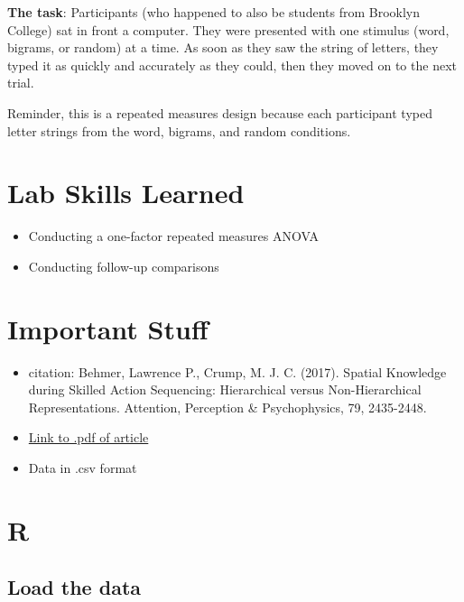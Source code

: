 \documentclass[
]{book}
\providecommand{\tightlist}{%
  \setlength{\itemsep}{0pt}\setlength{\parskip}{0pt}}
\begin{document}
\textbf{The task}: Participants (who happened to also be students from Brooklyn College) sat in front a computer. They were presented with one stimulus (word, bigrams, or random) at a time. As soon as they saw the string of letters, they typed it as quickly and accurately as they could, then they moved on to the next trial.

Reminder, this is a repeated measures design because each participant typed letter strings from the word, bigrams, and random conditions.

\hypertarget{lab-skills-learned-3}{%
\section{Lab Skills Learned}\label{lab-skills-learned-3}}

\begin{itemize}
\tightlist
\item
  Conducting a one-factor repeated measures ANOVA
\item
  Conducting follow-up comparisons
\end{itemize}

\hypertarget{important-stuff-3}{%
\section{Important Stuff}\label{important-stuff-3}}

\begin{itemize}
\tightlist
\item
  citation: Behmer, Lawrence P., Crump, M. J. C. (2017). Spatial Knowledge during Skilled Action Sequencing: Hierarchical versus Non-Hierarchical Representations. Attention, Perception \& Psychophysics, 79, 2435-2448.
\item
  \href{https://github.com/CrumpLab/CrumpLab.github.io/raw/master/files/8753/Behmer\%20and\%20Crump\%20-\%202017.pdf}{Link to .pdf of article}
\item
  Data in .csv format
\end{itemize}

\hypertarget{r-8}{%
\section{R}\label{r-8}}

\hypertarget{load-the-data-3}{%
\subsection{Load the data}\label{load-the-data-3}}
\end{document}
